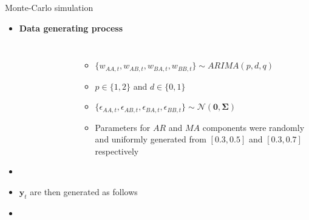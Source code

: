 \documentclass[11pt,xcolor=dvipsnames,handout]{beamer} %
\begin{document}
\begin{frame}[noframenumbering]{Monte-Carlo simulation}
\begin{itemize}[<+-| alert@+>]
	\item \textbf{Data generating process}\hypertarget{Simulation}{}
	\begin{columns}
		\centering
		\begin{figure}
			\begin{center}
				  
				 
				\qobitree
			\end{center}
		\end{figure}
		
		\begin{itemize}[<+-| alert@+>]
			\item $\{w_{AA,t},w_{AB,t},w_{BA,t},w_{BB,t}\} \sim ARIMA(p,d,q)$ 	
			\item	$p \in \{1,2\}$ and $d \in \{0,1\}$
			\item $\{\epsilon_{AA,t},\epsilon_{AB,t},\epsilon_{BA,t},\epsilon_{BB,t}\} \sim \mathcal{N}(\bm{0}, \bm{\Sigma})$
			\item Parameters for $AR$ and $MA$ components were randomly and uniformly generated from $[0.3,0.5]$ and $[0.3,0.7]$ respectively
			
		\end{itemize}	
	\end{columns} 
	
	\item[]
	\item $\bm{y}_t$ are then generated as follows
	\item[]\begin{table}
		\small
		\centering %
	\end{table}
	
	
\end{itemize} 
\end{frame}
%
\end{document}
